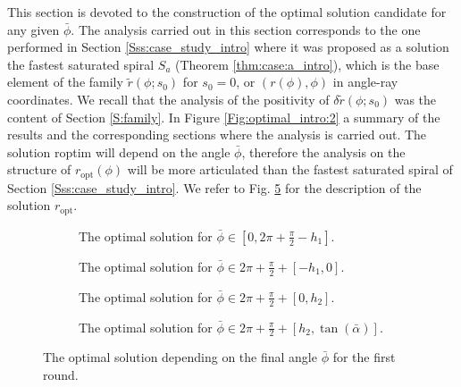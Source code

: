 \documentclass[reqno]{amsart}
\theoremstyle{definition} \newtheorem{definition}{Definition}[section]
\theoremstyle{definition} \newtheorem{remark}[definition]{Remark}
\theoremstyle{plain} \newtheorem{lemma}[definition]{Lemma}
\theoremstyle{plain} \newtheorem{proposition}[definition]{Proposition}
\theoremstyle{plain} \newtheorem{theorem}[definition]{Theorem}
\theoremstyle{plain} \newtheorem{corollary}[definition]{Corollary}
\theoremstyle{definition} \newtheorem{example}[definition]{Example}
\theoremstyle{plain} \newtheorem{claim}[clai]{Claim}
\theoremstyle{definition} \newtheorem{assumption}[definition]{Assumption}
\theoremstyle{definition} \newtheorem{observation}[definition]{Observation}
\newcommand{\1}{\mathbbm 1}
\numberwithin{equation}{section} %
\theoremstyle{plain} \newtheorem*{theorem*}{Theorem}
\theoremstyle{plain} \newtheorem{mthm}[maintheorem]{Main Theorem}
\theoremstyle{plain} \newtheorem*{mthm*}{Main Theorem}
\theoremstyle{plain} \newtheorem*{conjecture*}{Conjecture}
\theoremstyle{plain} \newtheorem{conjecture}[definition]{Conjecture}
\theoremstyle{plain} \newtheorem*{problem*}{Problem}
\begin{document}
This section is devoted to the construction of the optimal solution candidate for any given $\bar \phi$.  The analysis carried out in this section corresponds to the one performed in Section \ref{Sss:case_study_intro} where it was proposed as a solution the fastest saturated spiral $S_a$ (Theorem \ref{thm:case:a_intro}), which is  the base element of the family $\tilde r(\phi;s_0)$ for $s_0=0$, or $(r(\phi),\phi)$ in angle-ray coordinates. We recall that the analysis of the positivity of $\delta \tilde r(\phi;s_0)$ was the content of Section \ref{S:family}. In Figure \ref{Fig:optimal_intro:2} a summary of the results and the corresponding sections where the analysis is carried out.  The solution \gls{roptim} will depend on the angle $\bar \phi$, therefore the analysis on the structure of $r_{\text{opt}}(\phi)$ will be more articulated than the fastest saturated spiral of Section \ref{Sss:case_study_intro}. We refer to Fig. \ref{Fig:opt_spiral_intro} for the description of the solution $r_\mathrm{opt}$.

\begin{figure}
\begin{subfigure}{.475\textwidth}
\resizebox{\textwidth}{!}{}
\caption{The optimal solution for $\bar \phi \in [0,2\pi + \frac{\pi}{2} - h_1]$.}
\label{Fig:spiral_opt_first}
\end{subfigure} \hfill
\begin{subfigure}{.475\textwidth}
\resizebox{\textwidth}{!}{}
\caption{The optimal solution for $\bar \phi \in 2\pi + \frac{\pi}{2} + [- h_1,0]$.}
\label{Fig:spiral_opt_first_2}
\end{subfigure}
\begin{subfigure}{.475\textwidth}
\resizebox{\textwidth}{!}{}
\caption{The optimal solution for $\bar \phi \in 2\pi + \frac{\pi}{2} + [0,h_2]$.}
\label{Fig:spiral_opt_first_3}
\end{subfigure} \hfill
\begin{subfigure}{.475\textwidth}
\resizebox{\textwidth}{!}{}
\caption{The optimal solution for $\bar \phi \in 2\pi + \frac{\pi}{2} + [h_2,\tan(\bar \alpha)]$.}
\label{Fig:spiral_opt_first_4}
\end{subfigure}
\caption{The optimal solution depending on the final angle $\bar \phi$ for the first round.}
\label{Fig:opt_spiral_intro}
\end{figure}
\end{document}
